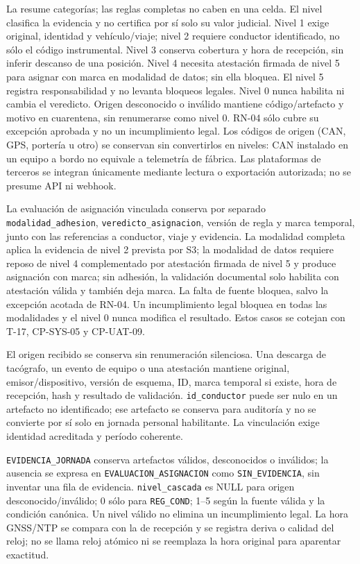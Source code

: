 La  resume categorías; las reglas completas no caben en una celda. El nivel clasifica la evidencia y no certifica por sí solo su valor judicial. Nivel 1 exige original, identidad y vehículo/viaje; nivel 2 requiere conductor identificado, no sólo el código instrumental. Nivel 3 conserva cobertura y hora de recepción, sin inferir descanso de una posición. Nivel 4 necesita atestación firmada de nivel 5 para asignar con marca en modalidad de datos; sin ella bloquea. El nivel 5 registra responsabilidad y no levanta bloqueos legales. Nivel 0 nunca habilita ni cambia el veredicto. Origen desconocido o inválido mantiene código/artefacto y motivo en cuarentena, sin renumerarse como nivel 0. RN-04 sólo cubre su excepción aprobada y no un incumplimiento legal. Los códigos de origen (CAN, GPS, portería u otro) se conservan sin convertirlos en niveles: CAN instalado en un equipo a bordo no equivale a telemetría de fábrica. Las plataformas de terceros se integran únicamente mediante lectura o exportación autorizada; no se presume API ni webhook.

La evaluación de asignación vinculada conserva por separado \texttt{modalidad\_\allowbreak{}adhesion}, \texttt{veredicto\_\allowbreak{}asignacion}, versión de regla y marca temporal, junto con las referencias a conductor, viaje y evidencia. La modalidad completa aplica la evidencia de nivel 2 prevista por S3; la modalidad de datos requiere reposo de nivel 4 complementado por atestación firmada de nivel 5 y produce asignación con marca; sin adhesión, la validación documental solo habilita con atestación válida y también deja marca. La falta de fuente bloquea, salvo la excepción acotada de RN-04. Un incumplimiento legal bloquea en todas las modalidades y el nivel 0 nunca modifica el resultado. Estos casos se cotejan con T-17, CP-SYS-05 y CP-UAT-09.

El origen recibido se conserva sin renumeración silenciosa. Una descarga de tacógrafo, un evento de equipo o una atestación mantiene original, emisor/dispositivo, versión de esquema, ID, marca temporal si existe, hora de recepción, hash y resultado de validación. \texttt{id\_\allowbreak{}conductor} puede ser nulo en un artefacto no identificado; ese artefacto se conserva para auditoría y no se convierte por sí solo en jornada personal habilitante. La vinculación exige identidad acreditada y período coherente.

\texttt{EVIDENCIA\_\allowbreak{}JORNADA} conserva artefactos válidos, desconocidos o inválidos; la ausencia se expresa en \texttt{EVALUACION\_\allowbreak{}ASIGNACION} como \texttt{SIN\_\allowbreak{}EVIDENCIA}, sin inventar una fila de evidencia. \texttt{nivel\_\allowbreak{}cascada} es NULL para origen desconocido/inválido; 0 sólo para \texttt{REG\_\allowbreak{}COND}; 1–5 según la fuente válida y la condición canónica. Un nivel válido no elimina un incumplimiento legal. La hora GNSS/NTP se compara con la de recepción y se registra deriva o calidad del reloj; no se llama reloj atómico ni se reemplaza la hora original para aparentar exactitud.


